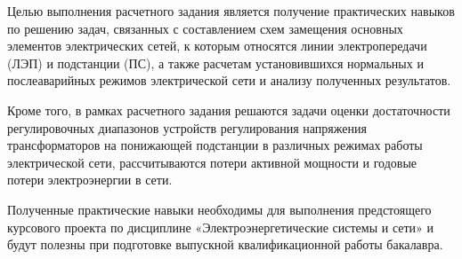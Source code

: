 \Introduction

Целью выполнения расчетного задания является получение практических навыков по решению задач, связанных с составлением схем замещения основных элементов электрических сетей, к которым относятся линии электропередачи (ЛЭП) и подстанции (ПС), а также расчетам установившихся нормальных и послеаварийных режимов электрической сети и анализу полученных результатов.

Кроме того, в рамках расчетного задания решаются задачи оценки достаточности регулировочных диапазонов устройств регулирования напряжения трансформаторов на понижающей подстанции в различных режимах работы электрической сети, рассчитываются потери активной мощности и годовые потери электроэнергии в сети.

Полученные практические навыки необходимы для выполнения предстоящего курсового проекта по дисциплине «Электроэнергетические системы и сети» и будут полезны при подготовке выпускной квалификационной работы бакалавра.
